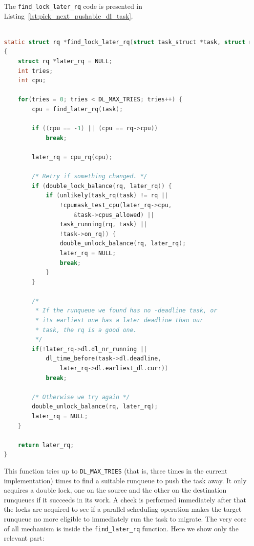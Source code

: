 The \texttt{find\_lock\_later\_rq} code is presented in
Listing~\ref{lst:pick_next_pushable_dl_task}.

\begin{lstlisting}[language=C, caption={\texttt{\emph{pick\_next\_pushable\_dl\_task} function}},
				label={lst:pick_next_pushable_dl_task}]

static struct rq *find_lock_later_rq(struct task_struct *task, struct rq *rq)
{
	struct rq *later_rq = NULL;
	int tries;
	int cpu;

	for(tries = 0; tries < DL_MAX_TRIES; tries++) {
		cpu = find_later_rq(task);

		if ((cpu == -1) || (cpu == rq->cpu))
			break;

		later_rq = cpu_rq(cpu);

		/* Retry if something changed. */
		if (double_lock_balance(rq, later_rq)) {
			if (unlikely(task_rq(task) != rq ||
				!cpumask_test_cpu(later_rq->cpu,
					&task->cpus_allowed) ||
				task_running(rq, task) ||
				!task->on_rq)) {
				double_unlock_balance(rq, later_rq);
				later_rq = NULL;
				break;
			}
		}

		/*
		 * If the runqueue we found has no -deadline task, or
		 * its earliest one has a later deadline than our
		 * task, the rq is a good one.
		 */
		if(!later_rq->dl.dl_nr_running ||
			dl_time_before(task->dl.deadline,
				later_rq->dl.earliest_dl.curr))
			break;

		/* Otherwise we try again */
		double_unlock_balance(rq, later_rq);
		later_rq = NULL;
	}
	
	return later_rq;
} 

\end{lstlisting}

This function tries up to \texttt{DL\_MAX\_TRIES} (that is, three times in the
current implementation) times to find a suitable
runqueue to push the task away. It only acquires a double lock, one on the 
source and the other on the destination runqueues if it succeeds in its work.
A check is performed immediately after that the locks are acquired to see if
a parallel scheduling operation makes the target runqueue no more eligible to
immediately run the task to migrate. 
The very core of all mechanism is inside the \texttt{find\_later\_rq} function.
Here we show only the relevant part:

